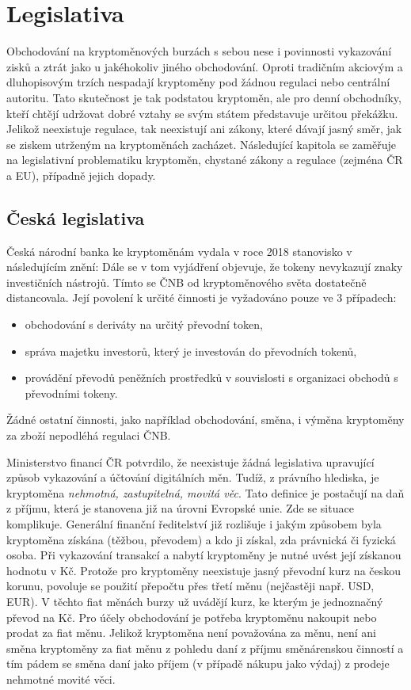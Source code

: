 \chapter{Legislativa}
\label{sec:Legislation}
Obchodování na kryptoměnových burzách s sebou nese i povinnosti vykazování zisků a ztrát jako u jakéhokoliv jiného obchodování. Oproti tradičním akciovým a dluhopisovým trzích nespadají kryptoměny pod žádnou
regulaci nebo centrální autoritu. Tato skutečnost je tak podstatou kryptoměn, ale pro denní obchodníky, kteří chtějí udržovat dobré vztahy se svým státem představuje určitou překážku.
Jelikož neexistuje regulace, tak neexistují ani zákony, které dávají jasný směr, jak se ziskem utrženým na kryptoměnách zacházet. Následující kapitola se zaměřuje na legislativní problematiku
kryptoměn, chystané zákony a regulace (zejména ČR a EU), případně jejich dopady.


\section*{Česká legislativa}
Česká národní banka ke kryptoměnám vydala v roce 2018 stanovisko v následujícím znění:  \cite{crypto:cz-national-bank}
Dále se v tom vyjádření objevuje, že tokeny nevykazují znaky investičních nástrojů. Tímto se ČNB od kryptoměnového světa dostatečně distancovala. Její povolení k určité činnosti
je vyžadováno pouze ve 3 případech:
\begin{itemize}
    \item obchodování s deriváty na určitý převodní token,
    \item správa majetku investorů, který je investován do převodních tokenů,
    \item provádění převodů peněžních prostředků v souvislosti s organizaci obchodů s převodními tokeny.
\end{itemize}
Žádné ostatní činnosti, jako například obchodování, směna, i výměna kryptoměny za zboží nepodléhá regulaci ČNB.

Ministerstvo financí ČR potvrdilo, že neexistuje žádná legislativa upravující způsob vykazování a účtování digitálních měn. \cite{crypto:cz-ministry-of-finance}
Tudíž, z právního hlediska, je kryptoměna \emph{nehmotná, zastupitelná, movitá věc}. Tato definice je postačují na daň z příjmu, která je stanovena již na úrovni Evropské unie.
Zde se situace komplikuje. Generální finanční ředitelství již rozlišuje i jakým způsobem byla kryptoměna získána (těžbou, převodem) a kdo ji získal, zda právnická či fyzická osoba.
Při vykazování transakcí a nabytí kryptoměny je nutné uvést její získanou hodnotu v Kč. Protože pro kryptoměny neexistuje jasný převodní kurz na českou korunu, povoluje se použití přepočtu přes
třetí měnu (nejčastěji např. USD, EUR). V těchto fiat měnách burzy už uvádějí kurz, ke kterým je jednoznačný převod na Kč.
Pro účely obchodování je potřeba kryptoměnu nakoupit nebo prodat za fiat měnu. Jelikož kryptoměna není považována za měnu, není ani směna kryptoměny za fiat měnu z pohledu
daní z příjmu směnárenskou činností a tím pádem se směna daní jako příjem (v případě nákupu jako výdaj) z prodeje nehmotné movité věci.

